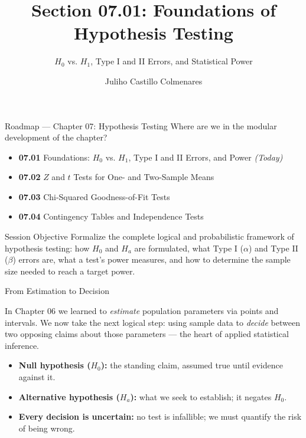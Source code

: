 \documentclass[10pt, aspectratio=169]{beamer}
\title[Hypothesis Testing Foundations]{Section 07.01: Foundations of Hypothesis Testing}
\subtitle{$H_0$ vs. $H_1$, Type I and II Errors, and Statistical Power}
\author[J. Castillo Colmenares]{Juliho Castillo Colmenares}
\institute{Tecnológico de Monterrey}
\date{\vspace{-1.5cm}}
\begin{document}
\begin{frame}[plain]
  \titlepage
\end{frame}

\begin{frame}{Roadmap --- Chapter 07: Hypothesis Testing}
  \footnotesize
  Where are we in the modular development of the chapter? \pause
  \begin{itemize}\itemsep=0.08em
    \item \textbf{07.01} Foundations: $H_0$ vs. $H_1$, Type I and II Errors, and Power \emph{(Today)} \pause
    \item \textbf{07.02} $Z$ and $t$ Tests for One- and Two-Sample Means \pause
    \item \textbf{07.03} Chi-Squared Goodness-of-Fit Tests \pause
    \item \textbf{07.04} Contingency Tables and Independence Tests
  \end{itemize}
  \vspace{-0.05cm}
  \begin{block}{Session Objective}
    Formalize the complete logical and probabilistic framework of hypothesis testing: how $H_0$ and $H_a$ are formulated, what Type I ($\alpha$) and Type II ($\beta$) errors are, what a test's power measures, and how to determine the sample size needed to reach a target power.
  \end{block}
\end{frame}

\begin{frame}{From Estimation to Decision}
  \footnotesize
  \begin{motivacion}
    In Chapter 06 we learned to \emph{estimate} population parameters via points and intervals. We now take the next logical step: using sample data to \emph{decide} between two opposing claims about those parameters --- the heart of applied statistical inference.
  \end{motivacion}

  \vspace{0.15cm}
  \pause
  \begin{itemize}\itemsep=0.1cm
    \item \textbf{Null hypothesis ($H_0$):} the standing claim, assumed true until evidence against it. \pause
    \item \textbf{Alternative hypothesis ($H_a$):} what we seek to establish; it negates $H_0$. \pause
    \item \textbf{Every decision is uncertain:} no test is infallible; we must quantify the risk of being wrong.
  \end{itemize}
\end{frame}
\end{document}
